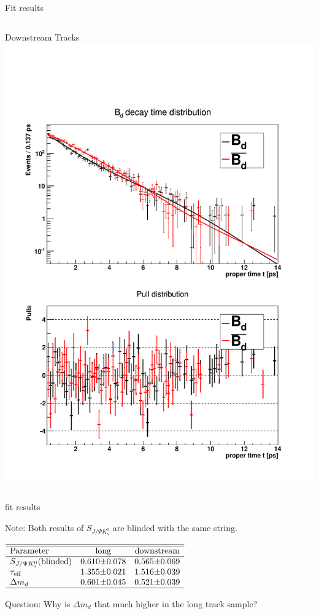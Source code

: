 \documentclass{beamer}
\newcommand{\SJPsi}{S_{J/\Psi K_s^0}}
\begin{document}
\begin{frame}{Fit results}
\begin{columns}
\begin{block}{Downstream Tracks}
	\includegraphics[width=\textwidth]{decay_distribution_ds}
	\end{block}
	\end{columns}

	\end{frame}
	
	\begin{frame}{fit results}
	\begin{alert}{Note:}
	Both results of $\SJPsi$ are blinded with the same string.
	\end{alert}
	\begin{center}
	$\begin{array}{l r@{\pm}l r@{\pm}l}
	\hline \hline
	\text{Parameter} & \multicolumn{2}{c}{\text{long}} & \multicolumn{2}{c}{\text{downstream}}\\ \hline
	\SJPsi (\text{blinded})    & 0.610 & 0.078 & 0.565 & 0.069 \\
	\tau_{\text{eff}}       & 1.355 & 0.021 & 1.516 & 0.039 \\
	\Delta m_d & 0.601 & 0.045 & 0.521 & 0.039 \\
	\hline
	\end{array}$
	\end{center}
	\begin{alert}{Question:}
	Why is $\Delta m_d$ that much higher in the long track sample?
	\end{alert}
	\end{frame}
\end{document}
